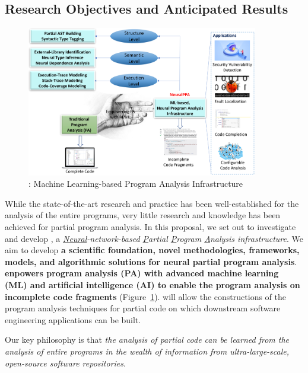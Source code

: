 \subsection{Research Objectives and Anticipated Results}

\begin{figure}[t]
    \centering
    \includegraphics[width=0.9\textwidth]{graphs/neuralppa}
    \vspace{-12pt}
    \caption{{\tool}: Machine Learning-based Program Analysis Infrastructure}
    \label{fig:arch}
\end{figure}


While the state-of-the-art research and practice has been
well-established for the analysis of the entire programs, very little
research and knowledge has been achieved for partial program
analysis.
%
In this proposal, we set out to investigate and develop {\tool}, a
{\em \underline{Neural}-network-based \underline{P}artial
  \underline{P}rogram \underline{A}nalysis infrastructure}. We aim to
develop {\bf a scientific foundation, novel methodologies, frameworks,
  models, and algorithmic solutions for neural partial program
  analysis}. {\tool} {\bf enpowers program analysis (PA) with advanced
machine learning (ML) and artificial intelligence (AI) to enable the
program analysis on incomplete code fragments} (Figure~\ref{fig:arch}).
{\tool} will allow the constructions of the program analysis
techniques for partial code on which downstream software
engineering applications can be built.


Our key philosophy is that {\em the analysis of partial code can be
  learned from the analysis of entire programs in the wealth of
  information from ultra-large-scale, open-source software
  repositories}.



